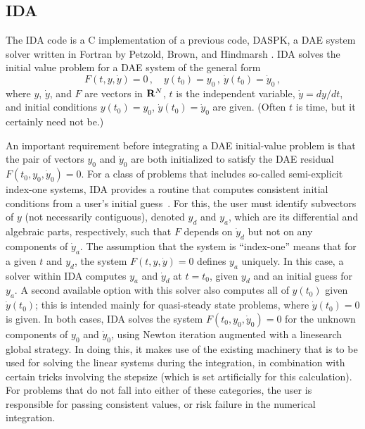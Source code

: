 \subsection{IDA}\label{ss:IDA}

The IDA code is a C implementation of a previous code, DASPK, a DAE
system solver written in Fortran by Petzold, Brown, and Hindmarsh
\cite{BHP:94,BCP:96}.  IDA solves the initial value problem for 
a DAE system of the general form
\begin{equation}\label{e:DAE}
  F(t,y,{\dot y}) = 0 \, ,
  \quad y(t_0) = y_0 \, ,~ {\dot y}(t_0) = {\dot y}_0 \, ,
\end{equation}
where $y$, ${\dot y}$, and $F$ are vectors in ${\bf R}^N$, $t$ is the independent
variable, ${\dot y} = dy/dt$, 
and initial conditions $y(t_0) = y_0$, ${\dot y}(t_0) = {\dot y}_0$ 
are given.  (Often $t$ is time, but it certainly need not be.)

An important requirement before integrating a DAE initial-value problem
is that the pair of vectors $y_0$ and ${\dot y_0}$ are both initialized to
satisfy the DAE residual $F(t_0,y_0, {\dot y}_0) = 0$.
For a class of problems that includes so-called
semi-explicit index-one systems, IDA provides a routine that computes
consistent initial conditions from a user's initial guess~\cite{BHP:98}.  
For this, the user must identify subvectors of $y$
(not necessarily contiguous), denoted $y_d$ and $y_a$, which are its
differential and algebraic parts, respectively, such that $F$ depends
on ${\dot y}_d$ but not on any components of ${\dot y}_a$.  The assumption that
the system is ``index-one'' means that for a given $t$ and $y_d$, the
system $F(t,y,{\dot y}) = 0$ defines $y_a$ uniquely.  In this case, a solver
within IDA computes $y_a$ and ${\dot y}_d$ at $t = t_0$, given $y_d$ and an
initial guess for $y_a$.  A second available option with this solver
also computes all of $y(t_0)$ given ${\dot y}(t_0)$; this is intended mainly
for quasi-steady state problems, where ${\dot y}(t_0) = 0$ is given.
In both cases, IDA solves the system $F(t_0,y_0, {\dot y}_0) = 0$ for the
unknown components of $y_0$ and ${\dot y}_0$, using Newton iteration
augmented with a linesearch global strategy.  In doing this, it makes
use of the existing machinery that is to be used for solving the
linear systems during the integration, in combination with certain
tricks involving the stepsize (which is set artificially for this
calculation).
For problems that do not fall into either of these categories, the
user is responsible for passing consistent values, or risk failure in
the numerical integration.

